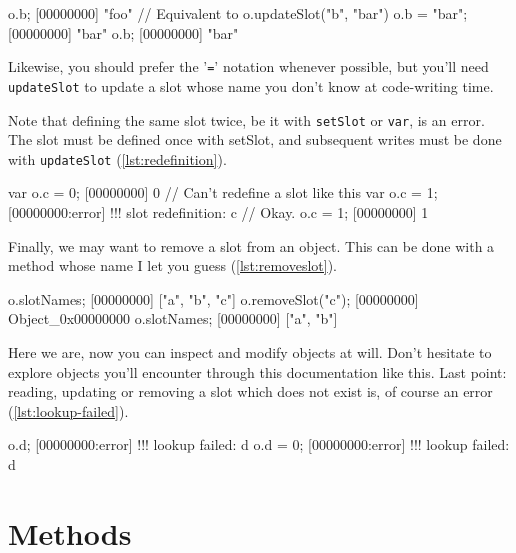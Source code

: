 \documentclass[openright,twoside,12pt]{report}
\begin{document}
\begin{urbiscript}[caption=Updating a slot with '\texttt{=}',
  label=lst:updateslot-eq, name=object-slots]
o.b;
[00000000] "foo"
// Equivalent to o.updateSlot("b", "bar")
o.b = "bar";
[00000000] "bar"
o.b;
[00000000] "bar"
\end{urbiscript}

Likewise, you should prefer the '\texttt{=}' notation whenever
possible, but you'll need \texttt{updateSlot} to update a slot whose
name you don't know at code-writing time.

Note that defining the same slot twice, be it with \texttt{setSlot} or
\texttt{var}, is an error. The slot must be defined once with setSlot,
and subsequent writes must be done with \texttt{updateSlot}
(\autoref{lst:redefinition}).

\begin{urbiscript}[caption=Defining a slot twice is an error,
  label=lst:redefinition, name=object-slots]
var o.c = 0;
[00000000] 0
// Can't redefine a slot like this
var o.c = 1;
[00000000:error] !!! slot redefinition: c
// Okay.
o.c = 1;
[00000000] 1
\end{urbiscript}

Finally, we may want to remove a slot from an object. This can be done
with a method whose name I let you guess (\autoref{lst:removeslot}).

\begin{urbiscript}[caption=Removing a slot, label=lst:removeslot,
  name=object-slots]
o.slotNames;
[00000000] ["a", "b", "c"]
o.removeSlot("c");
[00000000] Object_0x00000000
o.slotNames;
[00000000] ["a", "b"]
\end{urbiscript}

Here we are, now you can inspect and modify objects at will. Don't
hesitate to explore \urbi objects you'll encounter through this
documentation like this. Last point: reading, updating or removing a
slot which does not exist is, of course an error
(\autoref{lst:lookup-failed}).

\begin{urbiscript}[caption=Manipulating nonexistent slot is an error,
  label=lst:lookup-failed, name=object-slots]
o.d;
[00000000:error] !!! lookup failed: d
o.d = 0;
[00000000:error] !!! lookup failed: d
\end{urbiscript}

\section{Methods}
\end{document}

